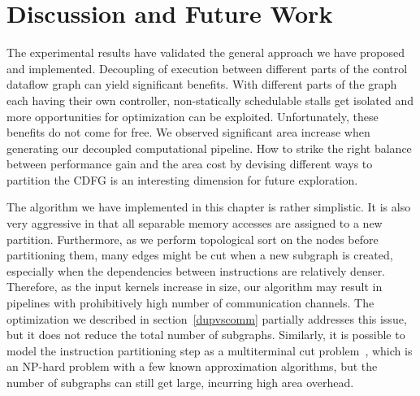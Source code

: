 \section{Discussion and Future Work}
The experimental results have validated the general approach we have proposed and implemented. 
Decoupling of execution between different parts of the control dataflow graph can yield
significant benefits. With different parts of the graph each having their own controller, non-statically schedulable stalls get isolated and more opportunities for
optimization can be exploited. Unfortunately, these benefits do not come for free. We observed significant area increase when generating our decoupled computational pipeline.
How to strike the right balance between performance gain and the area cost by devising different ways to partition the CDFG is an interesting dimension for future exploration.

The algorithm we have implemented in this chapter is rather simplistic. 
It is also very aggressive in that all separable memory accesses are assigned to a new partition.
Furthermore, as we perform topological sort on the nodes before partitioning them, many
edges might be cut when a new subgraph is created, especially when the dependencies between instructions are relatively denser.
Therefore, as the input kernels increase in size, our algorithm may result in pipelines with prohibitively high number of communication channels. The optimization we described in section~\ref{dupvscomm}
partially addresses this issue, but it does not reduce the total number of subgraphs. Similarly, it is possible to model the instruction partitioning
step as a multiterminal cut problem~\cite{}, which is an NP-hard problem with
a few known approximation algorithms, but the number of subgraphs
can still get large, incurring high area overhead.

